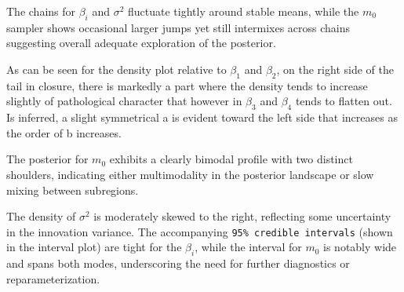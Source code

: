 \documentclass{Configuration_Files/PoliMi3i_thesis}
\begin{document}
The chains for \(\beta_i\) and \(\sigma^2\) fluctuate tightly around stable means, while the \(m_0\) sampler shows occasional larger jumps yet still intermixes across chains suggesting overall adequate exploration of the posterior.

As can be seen for the density plot relative to  \(\beta_1\) and \(\beta_2\), on the right side of the tail in closure, there is markedly a part where the density tends to increase slightly of pathological character that however in \(\beta_3\) and \(\beta_4\) tends to flatten out. Is inferred, a slight symmetrical a is evident toward the left side that increases as the order of b increases.  


The posterior for \(m_0\) exhibits a clearly bimodal profile with two distinct shoulders, indicating either multimodality in the posterior landscape or slow mixing between subregions.  

The density of \(\sigma^2\) is moderately skewed to the right, reflecting some uncertainty in the innovation variance.  The accompanying \texttt{95\% credible intervals} (shown in the interval plot) are tight for the \(\beta_i\), while the interval for \(m_0\) is notably wide and spans both modes, underscoring the need for further diagnostics or reparameterization.
\end{document}

